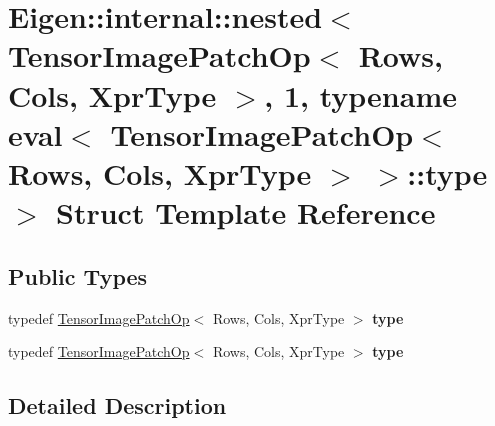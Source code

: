 \hypertarget{struct_eigen_1_1internal_1_1nested_3_01_tensor_image_patch_op_3_01_rows_00_01_cols_00_01_xpr_typbdbaf7e5a7b5b77870e0e3f45395b2a8}{}\section{Eigen\+:\+:internal\+:\+:nested$<$ Tensor\+Image\+Patch\+Op$<$ Rows, Cols, Xpr\+Type $>$, 1, typename eval$<$ Tensor\+Image\+Patch\+Op$<$ Rows, Cols, Xpr\+Type $>$ $>$\+:\+:type $>$ Struct Template Reference}
\label{struct_eigen_1_1internal_1_1nested_3_01_tensor_image_patch_op_3_01_rows_00_01_cols_00_01_xpr_typbdbaf7e5a7b5b77870e0e3f45395b2a8}
\subsection*{Public Types}
\begin{DoxyCompactItemize}
\item 
\mbox{\label{struct_eigen_1_1internal_1_1nested_3_01_tensor_image_patch_op_3_01_rows_00_01_cols_00_01_xpr_typbdbaf7e5a7b5b77870e0e3f45395b2a8_aa97b12a0ae66edba3be88dcb6e769a1f}} 
typedef \hyperlink{class_eigen_1_1_tensor_image_patch_op}{Tensor\+Image\+Patch\+Op}$<$ Rows, Cols, Xpr\+Type $>$ {\bfseries type}
\item 
\mbox{\label{struct_eigen_1_1internal_1_1nested_3_01_tensor_image_patch_op_3_01_rows_00_01_cols_00_01_xpr_typbdbaf7e5a7b5b77870e0e3f45395b2a8_aa97b12a0ae66edba3be88dcb6e769a1f}} 
typedef \hyperlink{class_eigen_1_1_tensor_image_patch_op}{Tensor\+Image\+Patch\+Op}$<$ Rows, Cols, Xpr\+Type $>$ {\bfseries type}
\end{DoxyCompactItemize}


\subsection{Detailed Description}
